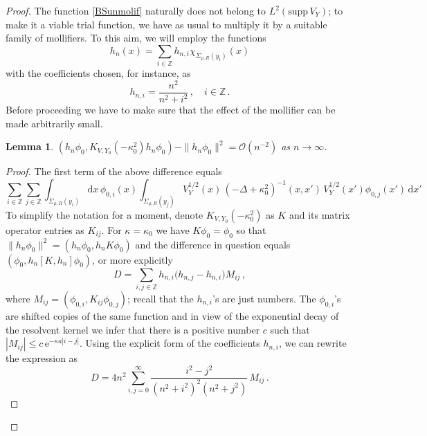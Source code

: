 \documentclass{article}
\numberwithin{equation}{section}
\newtheorem{lemma}[theorem]{Lemma}
\theoremstyle{definition}
\newcommand{\D}{\mathrm{d}}
\newcommand{\e}{\mathrm{e}}
\newcommand{\Z}{\mathbb{Z}}
\newcommand{\OO}{\mathcal{O}}
\begin{document}
\begin{proof}
The function \eqref{BSunmolif} naturally does not belong to $L^2(\mathrm{supp}\,V_Y)$; to make it a viable trial function, we have as usual to multiply it by a suitable family of mollifiers. To this aim, we will employ the functions
 \begin{equation} \label{BSmollif}
h_n(x) = \sum_{i\in\Z} h_{n,i} \chi_{\Sigma_{\rho,R}(y_i)}(x)
 \end{equation}
with the coefficients chosen, for instance, as
 \begin{equation} \label{mollifcoef}
h_{n,i} = \frac{n^2}{n^2+i^2}\,, \quad i\in\Z\,.
 \end{equation}
Before proceeding we have to make sure that the effect of the mollifier can be made arbitrarily small.
\begin{lemma} \label{l:BSmollif}
$(h_n\phi_0, K_{V,Y_0}(-\kappa_0^2)h_n\phi_0) - \|h_n\phi_0\|^2=\OO(n^{-2})$ as $n\to\infty$.
\end{lemma}
\begin{proof}
The first term of the above difference equals
\begin{equation*}
\sum_{i\in\Z} \sum_{j\in\Z} \int_{\Sigma_{\rho,R}(y_i)} \! \D x\, \phi_{0,i}(x) \int_{\Sigma_{\rho,R}(y_j)} \! V_Y^{1/2}(x)\, (-\Delta+\kappa_0^2)^{-1}(x,x')\, V_Y^{1/2}(x') \phi_{0,j}(x')\,\D x'
\end{equation*}
To simplify the notation for a moment, denote $K_{V,Y_0}(-\kappa_0^2)$ as $K$ and its matrix operator entries as $K_{ij}$. For $\kappa=\kappa_0$ we have $K\phi_0=\phi_0$ so that $\|h_n\phi_0\|^2 = (h_n\phi_0, h_n K\phi_0)$ and the difference in question equals $(\phi_0,h_n[K,h_n]\phi_0)$, or more explicitly
\begin{equation*}
D = \sum_{i,j\in\Z} h_{n,i} \big(h_{n,j}-h_{n,i}\big) M_{ij}\,,
\end{equation*}
where $M_{ij}= (\phi_{0,i}, K_{ij}\phi_{0,j})$; recall that the $h_{n,i}$'s are just numbers. The $\phi_{0,i}$'s are shifted copies of the same function and in view of the exponential decay of the resolvent kernel we infer that there is a positive number $c$ such that $|M_{ij}|\le c\,\e^{-\kappa a|i-j|}$. Using the explicit form of the coefficients $h_{n,i}$, we can rewrite the expression as
\begin{equation*}
D = 4n^2 \sum_{i,j=0}^\infty \frac{i^2-j^2}{(n^2+i^2)^2(n^2+j^2)}\,M_{ij}\,.

\end{equation*}
\end{proof}
\end{proof}
\end{document}
